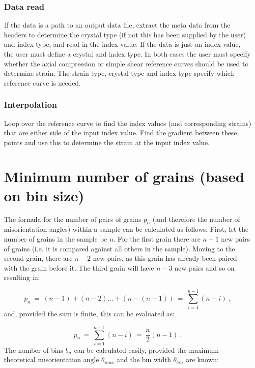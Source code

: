 \documentclass[a4paper,12pt,twoside]{report}
\numberwithin{equation}{chapter}
\begin{document}
\subsubsection{Data read}
If the data is a path to an output data file, extract the meta data from the headers to determine the crystal type (if not this has been supplied by the user) and index type, and read in the index value. If the data is just an index value, the user must define a crystal and index type. In both cases the user must specify whether the axial compression or simple shear reference curves should be used to determine strain. The strain type, crystal type and index type specify which reference curve is needed.

\subsubsection{Interpolation}
Loop over the reference curve to find the index values (and corresponding strains) that are either side of the input index value. Find the gradient between these points and use this to determine the strain at the input index value.


\section{Minimum number of grains (based on bin size)} \label{App:min_no_grains}
The formula for the number of pairs of grains $p_n$ (and therefore the number of misorientation angles) within a sample can be calculated as follows. First, let the number of grains in the sample be $n$. For the first grain there are $n - 1$ new pairs of grains (i.e. it is compared against all others in the sample). Moving to the second grain, there are $n - 2$ new pairs, as this grain has already been paired with the grain before it. The third grain will have $n - 3$ new pairs and so on resulting in:

\begin{equation}
p_n\ =\ (n-1) + (n-2) ... + (n - (n-1))\ =\ \sum_{i=1}^{n-1} (n - i)\ ,
\end{equation}   
\noindent
and, provided the sum is finite, this can be evaluated as:

\begin{equation}
p_n\ =\ \sum^{n-1}_{i=1}(n - i)\ =\ \frac{n}{2}(n-1)\ .
\end{equation}
\noindent
The number of bins $b_n$ can be calculated easily, provided the maximum theoretical misorientation angle $\theta_{max}$ and the bin width $\theta_{bin}$ are known:
\end{document}
